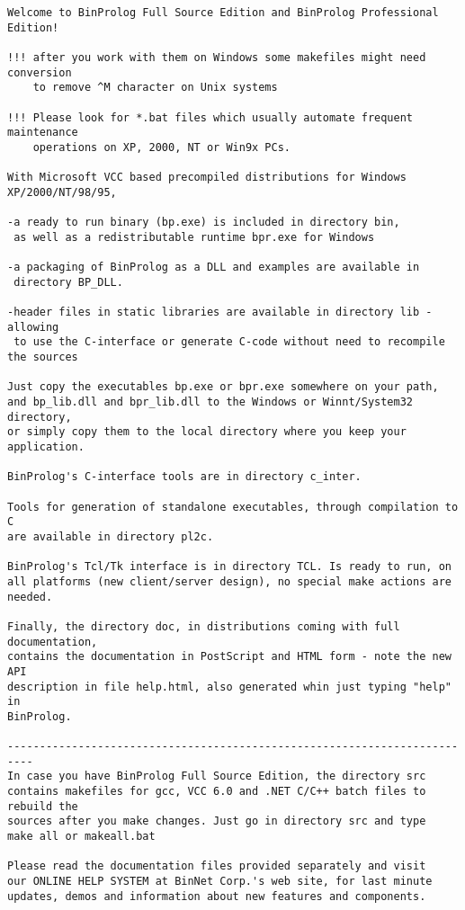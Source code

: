 \documentclass{article}
\begin{document}
{\small \begin{verbatim}
Welcome to BinProlog Full Source Edition and BinProlog Professional Edition!

!!! after you work with them on Windows some makefiles might need conversion 
    to remove ^M character on Unix systems

!!! Please look for *.bat files which usually automate frequent maintenance 
    operations on XP, 2000, NT or Win9x PCs.

With Microsoft VCC based precompiled distributions for Windows XP/2000/NT/98/95,

-a ready to run binary (bp.exe) is included in directory bin,
 as well as a redistributable runtime bpr.exe for Windows  

-a packaging of BinProlog as a DLL and examples are available in 
 directory BP_DLL.

-header files in static libraries are available in directory lib - allowing
 to use the C-interface or generate C-code without need to recompile the sources

Just copy the executables bp.exe or bpr.exe somewhere on your path, 
and bp_lib.dll and bpr_lib.dll to the Windows or Winnt/System32 directory, 
or simply copy them to the local directory where you keep your application.

BinProlog's C-interface tools are in directory c_inter.

Tools for generation of standalone executables, through compilation to C
are available in directory pl2c.

BinProlog's Tcl/Tk interface is in directory TCL. Is ready to run, on
all platforms (new client/server design), no special make actions are 
needed.

Finally, the directory doc, in distributions coming with full documentation,
contains the documentation in PostScript and HTML form - note the new API 
description in file help.html, also generated whin just typing "help" in 
BinProlog.

--------------------------------------------------------------------------
In case you have BinProlog Full Source Edition, the directory src
contains makefiles for gcc, VCC 6.0 and .NET C/C++ batch files to rebuild the
sources after you make changes. Just go in directory src and type
make all or makeall.bat

Please read the documentation files provided separately and visit
our ONLINE HELP SYSTEM at BinNet Corp.'s web site, for last minute
updates, demos and information about new features and components.


\end{verbatim}}
\end{document}
